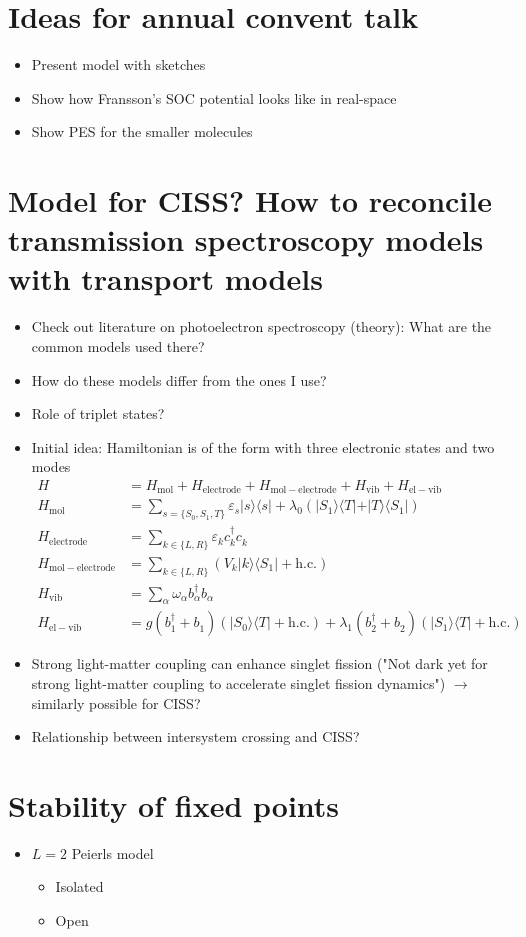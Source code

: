 \documentclass{article}
\newcommand{\pdagger}{{\phantom{\dagger}}}
\begin{document}
\section{Ideas for annual convent talk}
\begin{itemize}
	\item Present model with sketches
	\item Show how Fransson's SOC potential looks like in real-space
	\item Show PES for the smaller molecules
\end{itemize}
\section{Model for CISS? How to reconcile transmission spectroscopy models with transport models}
\begin{itemize}
	\item Check out literature on photoelectron spectroscopy (theory): What are the common models used there?
	\item How do these models differ from the ones I use?
	\item Role of triplet states?
	\item Initial idea: Hamiltonian is of the form with three electronic states and two modes
	\begin{align*}
		H &= H_\mathrm{mol} + H_\mathrm{electrode} + H_\mathrm{mol-electrode} + H_\mathrm{vib} + H_\mathrm{el-vib}\\
		H_\mathrm{mol} &= \sum_{s=\{S_0,S_1,T\}} \varepsilon_s \vert s\rangle \langle s\vert + \lambda_0 (\vert S_1\rangle \langle T\vert +\vert T\rangle \langle S_1\vert) \\
		H_\mathrm{electrode} &= \sum_{k\in\{L,R\}} \varepsilon_k c_k^\dagger c_k^\pdagger \\
		H_\mathrm{mol-electrode} &= \sum_{k\in\{L,R\}} (V_k \vert k\rangle \langle S_1\vert + \mathrm{h.c.})\\
		H_\mathrm{vib} &= \sum_\alpha \omega_\alpha b_\alpha^\dagger b_\alpha^\pdagger\\
		H_\mathrm{el-vib} &=g (b_1^\dagger+ b_1^\pdagger)(\vert S_0\rangle\langle T\vert + \mathrm{h.c.})+  \lambda_1 (b_2^\dagger+ b_2^\pdagger)(\vert S_1\rangle\langle T\vert + \mathrm{h.c.})
	\end{align*}
	\item Strong light-matter coupling can enhance singlet fission ("Not dark yet for strong light-matter coupling to accelerate singlet fission dynamics") $\rightarrow$ similarly possible for CISS?
	\item Relationship between intersystem crossing and CISS?
\end{itemize}
\section{Stability of fixed points}
\begin{itemize}
	\item $L=2$ Peierls model
	\begin{itemize}
		\item Isolated
		\item Open
	\end{itemize}
\end{itemize}
\printbibliography
\end{document}
